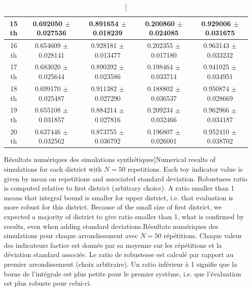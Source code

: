 \begin{table}[h!]
\begin{tabular}[6pt]{c|c|c|c|c}
\hline
15 th & 0.692050 $\pm$ 0.027536 & 0.891654 $\pm$ 0.018239 & 0.200860 $\pm$ 0.024085 & 0.929006 $\pm$ 0.031675\\[3pt]
\hline
16 th & 0.654609 $\pm$ 0.028141 & 0.928181 $\pm$ 0.013477 & 0.202355 $\pm$ 0.017180 & 0.963143 $\pm$ 0.033232\\[3pt]
\hline
17 th & 0.683020 $\pm$ 0.025644 & 0.890392 $\pm$ 0.023586 & 0.198464 $\pm$ 0.033714 & 0.941025 $\pm$ 0.034951\\[3pt]
\hline
18 th & 0.699170 $\pm$ 0.025487 & 0.911382 $\pm$ 0.027290 & 0.188802 $\pm$ 0.036537 & 0.950874 $\pm$ 0.028669\\[3pt]
\hline
19 th & 0.655108 $\pm$ 0.031857 & 0.884214 $\pm$ 0.027816 & 0.209234 $\pm$ 0.032466 & 0.962966 $\pm$ 0.034187\\[3pt]
\hline
20 th & 0.637446 $\pm$ 0.032562 & 0.873755 $\pm$ 0.036792 & 0.196807 $\pm$ 0.026001 & 0.952410 $\pm$ 0.038702\\[3pt]
\hline
\end{tabular}

\bigskip

\caption[Numerical results of synthetic simulations][Résultats numériques des simulations synthétiques]{Numerical results of simulations for each district with $N=50$ repetitions. Each toy indicator value is given by mean on repetitions and associated standard deviation. Robustness ratio is computed relative to first district (arbitrary choice). A ratio smaller than 1 means that integral bound is smaller for upper district, i.e. that evaluation is more robust for this district. Because of the small size of first district, we expected a majority of district to give ratio smaller than 1, what is confirmed by results, even when adding standard deviations.}{Résultats numériques des simulations pour chaque arrondissement avec $N=50$ répétitions. Chaque valeur des indicateurs factice est donnée par sa moyenne sur les répétitions et la déviation standard associée. Le ratio de robustesse est calculé par rapport au premier arrondissement (choix arbitraire). Un ratio inférieur à 1 signifie que la borne de l'intégrale est plus petite pour le premier système, i.e. que l'évaluation est plus robuste pour celui-ci.}


\end{table}



